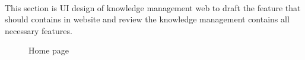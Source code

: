 \documentclass[12pt,oneside,openright,a4paper]{cpe-english-project}
\begin{document}

\nocite{*}



 \\

This section is UI design of knowledge management web to draft the feature that should 
contains in website and review the knowledge management contains all necessary features.

\begin{figure}[!h]\centering
{}
\caption{Home page}\label{fig:Home page}
\end{figure}
\end{document}
